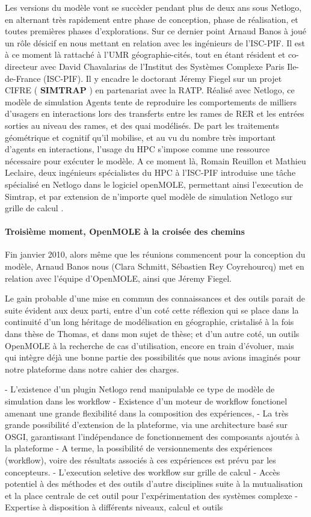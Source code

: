 Les versions du modèle vont se succèder pendant plus de deux ans sous Netlogo, en alternant très rapidement entre phase de conception, phase de réalisation, et toutes premières phases d'explorations. Sur ce dernier point Arnaud Banos à joué un rôle désicif en nous mettant en relation avec les ingénieurs de l'ISC-PIF. Il est à ce moment là rattaché à l'UMR géographie-cités, tout en étant résident et co-directeur avec David Chavalarias de l'Institut des Systèmes Complexe Paris Ile-de-France (ISC-PIF). Il y encadre le doctorant Jéremy Fiegel sur un projet CIFRE ( \textbf{SIMTRAP} ) en partenariat avec la RATP. Réalisé avec Netlogo, ce modèle de simulation Agents tente de reproduire les comportements de milliers d'usagers en interactions lors des transferts entre les rames de RER et les entrées sorties au niveau des rames, et des quai modélisés. De part les traitements géométrique et cognitif qu'il mobilise, et au vu du nombre très important d'agents en interactions, l'usage du HPC s'impose comme une ressource nécessaire pour exécuter le modèle. A ce moment là, Romain Reuillon et Mathieu Leclaire, deux ingénieurs spécialistes du HPC à l'ISC-PIF introduise une tâche spécialisé en Netlogo dans le logiciel openMOLE, permettant ainsi l'execution de Simtrap, et par extension de n'importe quel modèle de simulation Netlogo sur grille de calcul \autocite[53]{Banos2013}.

\paragraph{Troisième moment, OpenMOLE à la croisée des chemins}

Fin janvier 2010, alors même que les réunions commencent pour la conception du modèle, Arnaud Banos nous (Clara Schmitt, Sébastien Rey Coyrehourcq) met en relation avec l'équipe d'OpenMOLE, ainsi que Jéremy Fiegel.

Le gain probable d'une mise en commun des connaissances et des outils parait de suite évident aux deux parti, entre d'un coté cette réflexion qui se place dans la continuité d'un long héritage de modélisation en géographie, cristalisé à la fois dans thèse de Thomas, et dans mon sujet de thèse; et d'un autre coté, un outils OpenMOLE à la recherche de cas d'utilisation, encore en train d'évoluer, mais qui intègre déjà une bonne partie des possibilités que nous avions imaginés pour notre plateforme dans notre cahier des charges. 


- L'existence d'un plugin Netlogo rend manipulable ce type de modèle de simulation dans les workflow
- Existence d'un moteur de workflow fonctionel amenant une grande flexibilité dans la composition des expériences,
- La très grande possibilité d'extension de la plateforme, via une architecture basé sur OSGI, garantissant l'indépendance de fonctionnement des composants ajoutés à la plateforme
- A terme, la possibilité de versionnements des expériences (workflow), voire des résultats associés à ces expériences est prévu par les concepteurs.
- L'execution seletive des workflow sur grille de calcul
- Accès potentiel à des méthodes et des outils d'autre disciplines suite à la mutualisation et la place centrale de cet outil pour l'expérimentation des systèmes complexe
- Expertise à disposition à différents niveaux, calcul et outils

